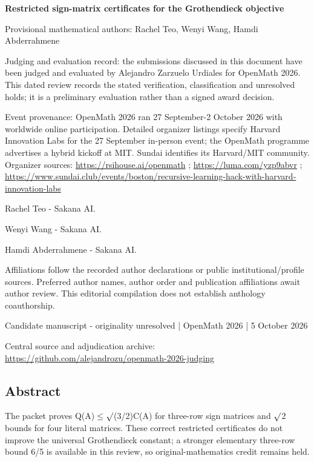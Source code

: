 \documentclass[11pt,a4paper]{article}
\begin{document}
{\LARGE\bfseries Restricted sign-matrix certificates for the Grothendieck objective\par}\medskip
{\small Provisional mathematical authors: Rachel Teo, Wenyi Wang, Hamdi Abderrahmene\par}\medskip
{\small Judging and evaluation record: the submissions discussed in this document have been judged and evaluated by Alejandro Zarzuelo Urdiales for OpenMath 2026. This dated review records the stated verification, classification and unresolved holds; it is a preliminary evaluation rather than a signed award decision.\par}

{\small Event provenance: OpenMath 2026 ran 27 September-2 October 2026 with worldwide online participation. Detailed organizer listings specify Harvard Innovation Labs for the 27 September in-person event; the OpenMath programme advertises a hybrid kickoff at MIT. Sundai identifies its Harvard/MIT community. Organizer sources: \url{https://rsihouse.ai/openmath} ; \url{https://luma.com/yzp9abvr} ; \url{https://www.sundai.club/events/boston/recursive-learning-hack-with-harvard-innovation-labs}\par}

{\small Rachel Teo  -  Sakana AI.\par}

{\small Wenyi Wang  -  Sakana AI.\par}

{\small Hamdi Abderrahmene  -  Sakana AI.\par}

{\small Affiliations follow the recorded author declarations or public institutional/profile sources. Preferred author names, author order and publication affiliations await author review. This editorial compilation does not establish anthology coauthorship.\par}

{\small Candidate manuscript  -  originality unresolved | OpenMath 2026 | 5 October 2026\par}\medskip
{\small Central source and adjudication archive: \url{https://github.com/alejandrozu/openmath-2026-judging}\par}

\subsection{Abstract}
The packet proves Q(A)\ensuremath{\leq}\ensuremath{\surd}(3/2)C(A) for three-row sign matrices and \ensuremath{\surd}2 bounds for four literal matrices. These correct restricted certificates do not improve the universal Grothendieck constant; a stronger elementary three-row bound 6/5 is available in this review, so original-mathematics credit remains held.
\end{document}
